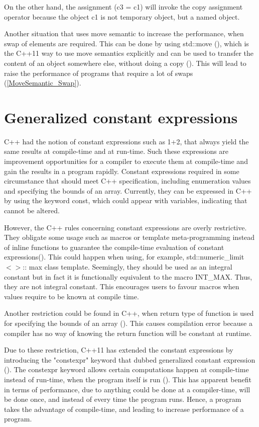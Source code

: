 \documentclass[11pt]{report}
\begin{document}
On the other hand, the assignment (c3 = c1) will invoke the copy assignment operator because the object c1 is not temporary object, but a named object.


Another situation that uses move semantic to increase the performance, when swap of elements are required. This can be done by using std::move (), which is the C++11 way to use move semantics explicitly and can be used to transfer the content of an object somewhere else, without doing a copy (\cite{Gregorie:professionalcpp}). This will lead to raise the performance of programs that require a lot of swaps (\ref{MoveSemantic_Swap}).


\section{Generalized constant expressions}
\label{section: Generalized constant expressions}
C++ had the notion of constant expressions such as 1+2, that always yield the same results at compile-time and at run-time. Such these expressions are improvement opportunities for a compiler to execute them at compile-time and gain the results in a program rapidly. Constant expressions required in some circumstance that should meet C++ specification, including enumeration values and specifying the bounds of an array. Currently, they can be expressed in C++ by using the keyword const, which could appear with variables, indicating that cannot be altered.

However, the C++ rules concerning constant expressions are overly restrictive. They obligate some usage such as macros or template meta-programming instead of inline functions to guarantee the compile-time evaluation of constant expressions(\cite{Stroustrup:2012:Cpp11}). This could happen when using, for example, std::numeric\_limit$<>$:: max  class template.  Seemingly, they should be used as an integral constant but in fact it is functionally equivalent to the macro INT\_MAX. Thus, they are not integral constant. This encourages users to favour macros when values require to be known at compile time.

Another restriction could be found in C++, when return type of function is used for specifying the bounds of an array (\cite{Stroustrup:2012:Cpp11}). This causes compilation error because a compiler has no way of knowing the return function will be constant at runtime.

Due to these restriction, C++11 has extended the constant expressions by introducing the "constexpr" keyword that dubbed generalized constant expression (\cite{Williams:2012:CCA}). The constexpr keyword allows certain computations happen at compile-time instead of run-time, when the program itself is run (\cite{Williams:2012:CCA}). This has apparent benefit in terms of performance, due to anything could be done at a compiler-time, will be done once, and instead of every time the program runs. Hence, a program takes the advantage of compile-time, and leading to increase performance of a program.
\end{document}
